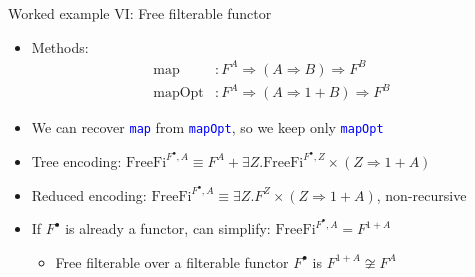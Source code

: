 \documentclass[english,,russian]{beamer}
\begin{document}
\begin{frame}{Worked example VI: Free filterable functor}
\begin{itemize}
\item Methods: {\footnotesize{}\vspace{-0.15cm}}
\begin{align*}
\text{map} & :F^{A}\Rightarrow\left(A\Rightarrow B\right)\Rightarrow F^{B}\\
\text{mapOpt} & :F^{A}\Rightarrow\left(A\Rightarrow1+B\right)\Rightarrow F^{B}
\end{align*}
\item {\footnotesize{}\vspace{-0.35cm}}We can recover \texttt{\textcolor{blue}{\footnotesize{}map}}
from \texttt{\textcolor{blue}{\footnotesize{}mapOpt}}, so we keep
only \texttt{\textcolor{blue}{\footnotesize{}mapOpt}} 
\item Tree encoding: $\text{FreeFi}^{F^{\bullet},A}\equiv F^{A}+\exists Z.\text{FreeFi}^{F^{\bullet},Z}\times\left(Z\Rightarrow1+A\right)$
\item Reduced encoding: $\text{FreeFi}^{F^{\bullet},A}\equiv\exists Z.F^{Z}\times\left(Z\Rightarrow1+A\right)$,
non-recursive
\item If $F^{\bullet}$ is already a functor, can simplify: $\text{FreeFi}^{F^{\bullet},A}=F^{1+A}$
\begin{itemize}
\item Free filterable over a filterable functor $F^{\bullet}$ is $F^{1+A}\not\cong F^{A}$
\end{itemize}
\end{itemize}
\end{frame}
\end{document}
